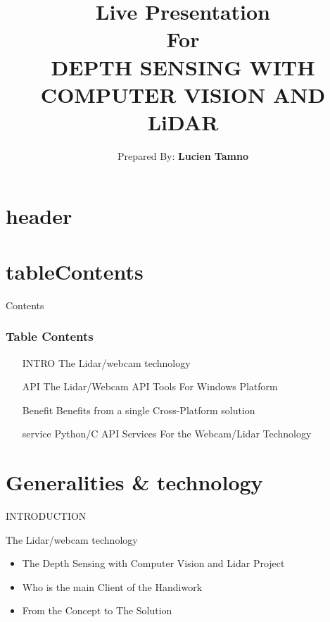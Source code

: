 \documentclass[10pt]{beamer}
\title[]{\Large Live Presentation \\\vspace{.5 in}
				\Large For\\\vspace{.2in}
			\textbf{DEPTH SENSING WITH COMPUTER VISION AND LiDAR}\\\vspace{.2 in}}
\author{Prepared By: \textbf{Lucien Tamno}}
\institute{Oregon State University}
\date{\displaydate{date}}
\begin{document}
\section{header}
\begin{frame}
\titlepage
\end{frame}

\section{tableContents}
\begin{frame}[t]{Contents} \vspace{.5 in}
\frametitle{Table Contents}
 \begin{itemize}
\item[INTRO] The Lidar/webcam technology
\item[API]  The Lidar/Webcam  API  Tools  For Windows Platform
\item [Benefit] Benefits from a single Cross-Platform solution
\item[service] Python/C API Services For the Webcam/Lidar Technology
\end{itemize}
\end{frame}


\section{ Generalities \& technology}
\begin{frame}[t]{INTRODUCTION}\vspace{.5 in}
 \begin{block}{The Lidar/webcam technology}
 	\begin{itemize}
	\item The Depth Sensing with Computer Vision and Lidar Project
	\item Who is the main Client of the Handiwork
	\item From the Concept to The Solution
	\end{itemize}
 \end{block}
\end{frame}
\end{document}
